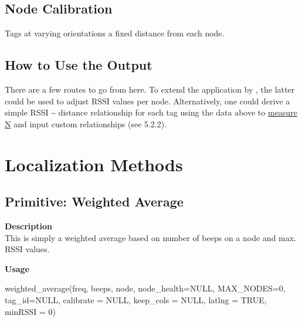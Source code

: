 \documentclass[
]{book}
\newenvironment{Shaded}{\begin{snugshade}}{\end{snugshade}}
\newcommand{\AttributeTok}[1]{\textcolor[rgb]{0.77,0.63,0.00}{#1}}
\newcommand{\ConstantTok}[1]{\textcolor[rgb]{0.00,0.00,0.00}{#1}}
\newcommand{\DecValTok}[1]{\textcolor[rgb]{0.00,0.00,0.81}{#1}}
\newcommand{\FunctionTok}[1]{\textcolor[rgb]{0.00,0.00,0.00}{#1}}
\newcommand{\NormalTok}[1]{#1}
\begin{document}
\hypertarget{node-calibration}{%
\section{Node Calibration}\label{node-calibration}}

Tags at varying orientations a fixed distance from each node.

\hypertarget{how-to-use-the-output}{%
\section{How to Use the Output}\label{how-to-use-the-output}}

There are a few routes to go from here. To extend the application by \citet{bircher2020extraterritorial}, the latter could be used to adjust RSSI values per node. Alternatively, one could derive a simple RSSI \textasciitilde{} distance relationship for each tag using the data above to \href{https://iotandelectronics.wordpress.com/2016/10/07/how-to-calculate-distance-from-the-rssi-value-of-the-ble-beacon/}{measure N} and input custom relationships (see 5.2.2).

\hypertarget{localization-methods}{%
\chapter{Localization Methods}\label{localization-methods}}

\hypertarget{primitive-weighted-average}{%
\section{Primitive: Weighted Average}\label{primitive-weighted-average}}

\textbf{Description}\\
This is simply a weighted average based on number of beeps on a node and max. RSSI values.

\textbf{Usage}

\begin{Shaded}
\begin{Highlighting}[]
\FunctionTok{weighted\_average}\NormalTok{(freq, beeps, node, }\AttributeTok{node\_health=}\ConstantTok{NULL}\NormalTok{, }\AttributeTok{MAX\_NODES=}\DecValTok{0}\NormalTok{, }\AttributeTok{tag\_id=}\ConstantTok{NULL}\NormalTok{, }\AttributeTok{calibrate =} \ConstantTok{NULL}\NormalTok{, }\AttributeTok{keep\_cols =} \ConstantTok{NULL}\NormalTok{, }\AttributeTok{latlng =} \ConstantTok{TRUE}\NormalTok{, }\AttributeTok{minRSSI =} \DecValTok{0}\NormalTok{)}
\end{Highlighting}
\end{Shaded}
\end{document}
